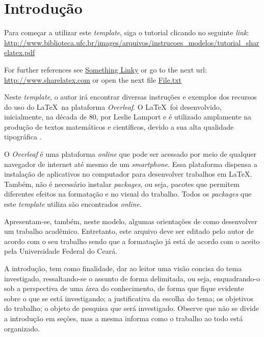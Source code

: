 \chapter{Introdução}
\label{cap:introducao}


Para começar a utilizar este \textit{template}, siga o tutorial clicando no seguinte \textit{link}:
\url{http://www.biblioteca.ufc.br/images/arquivos/instrucoes_modelos/tutorial_sharelatex.pdf}


For further references see \href{http://www.sharelatex.com}{Something Linky} or go to the next url: \url{http://www.sharelatex.com} or open the next file \href{run:./file.txt}{File.txt}

Neste \textit{template}, o autor irá encontrar diversas instruções e exemplos dos recursos do uso do \LaTeX~na plataforma \textit{Overleaf}. O \LaTeX~foi desenvolvido, inicialmente, na década de 80, por Leslie Lamport e é utilizado amplamente na produção de textos matemáticos e científicos, devido a sua alta qualidade tipográfica \cite{goossens1994latex}. 

O \textit{Overleaf} é uma plataforma \textit{online} que pode ser acessado por meio de qualquer navegador de internet até mesmo de um \textit{smartphone}. Essa plataforma dispensa a instalação de aplicativos no computador para desenvolver trabalhos em \LaTeX. Também, não é necessário instalar \textit{packages}, ou seja, pacotes que permitem diferentes efeitos na formatação e no visual do trabalho. Todos os \textit{packages} que este \textit{template} utiliza são encontrados \textit{online}. 

Apresentam-se, também, neste modelo, algumas orientações de como desenvolver um trabalho acadêmico. Entretanto, este arquivo deve ser editado pelo autor de acordo com o seu trabalho sendo que a formatação já está de acordo com o aceito pela Universidade Federal do Ceará.  

A introdução, tem como finalidade, dar ao leitor uma visão concisa do tema investigado, ressaltando-se o assunto de forma delimitada, ou seja, enquadrando-o sob a perspectiva de uma área do conhecimento, de forma que fique evidente sobre o que se está investigando; a justificativa da escolha do tema; os objetivos do trabalho; o objeto de pesquisa que será investigado. Observe que não se divide a introdução em seções, mas a mesma informa como o trabalho ao todo está organizado.




